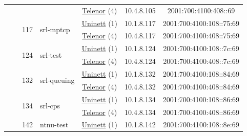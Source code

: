 \begin{small}
\begin{center}
\begin{longtable}{|c|c|c|c|c|c|c|c|}
  &  & \multicolumn{2}{|c|}{} & \multicolumn{2}{|c|}{\tiny{\href{https://www.telenor.no}{Telenor} (4)}} & \tiny{10.4.8.105} & \tiny{2001:700:4100:408::69} \\* \cline{3-3}\cline{4-4}\cline{5-5}\cline{6-6}\cline{7-7}\cline{8-8}
  &  & \multirow{2}{*}{\tiny{117}} & \multicolumn{1}{|l|}{\multirow{2}{*}{\tiny{srl-mptcp}}} & \multicolumn{2}{|c|}{\tiny{\href{https://www.uninett.no}{Uninett} (1)}} & \tiny{10.1.8.117} & \tiny{2001:700:4100:108::75:69} \\* \cline{5-5}\cline{6-6}\cline{7-7}\cline{8-8}
  &  &  &  & \multicolumn{2}{|c|}{\tiny{\href{https://www.telenor.no}{Telenor} (4)}} & \tiny{10.4.8.117} & \tiny{2001:700:4100:408::75:69} \\* \cline{3-3}\cline{4-4}\cline{5-5}\cline{6-6}\cline{7-7}\cline{8-8}
  &  & \multirow{2}{*}{\tiny{124}} & \multicolumn{1}{|l|}{\multirow{2}{*}{\tiny{srl-test}}} & \multicolumn{2}{|c|}{\tiny{\href{https://www.uninett.no}{Uninett} (1)}} & \tiny{10.1.8.124} & \tiny{2001:700:4100:108::7c:69} \\* \cline{5-5}\cline{6-6}\cline{7-7}\cline{8-8}
  &  &  &  & \multicolumn{2}{|c|}{\tiny{\href{https://www.telenor.no}{Telenor} (4)}} & \tiny{10.4.8.124} & \tiny{2001:700:4100:408::7c:69} \\* \cline{3-3}\cline{4-4}\cline{5-5}\cline{6-6}\cline{7-7}\cline{8-8}
  &  & \multirow{2}{*}{\tiny{132}} & \multicolumn{1}{|l|}{\multirow{2}{*}{\tiny{srl-queuing}}} & \multicolumn{2}{|c|}{\tiny{\href{https://www.uninett.no}{Uninett} (1)}} & \tiny{10.1.8.132} & \tiny{2001:700:4100:108::84:69} \\* \cline{5-5}\cline{6-6}\cline{7-7}\cline{8-8}
  &  &  &  & \multicolumn{2}{|c|}{\tiny{\href{https://www.telenor.no}{Telenor} (4)}} & \tiny{10.4.8.132} & \tiny{2001:700:4100:408::84:69} \\* \cline{3-3}\cline{4-4}\cline{5-5}\cline{6-6}\cline{7-7}\cline{8-8}
  &  & \multirow{2}{*}{\tiny{134}} & \multicolumn{1}{|l|}{\multirow{2}{*}{\tiny{srl-cps}}} & \multicolumn{2}{|c|}{\tiny{\href{https://www.uninett.no}{Uninett} (1)}} & \tiny{10.1.8.134} & \tiny{2001:700:4100:108::86:69} \\* \cline{5-5}\cline{6-6}\cline{7-7}\cline{8-8}
  &  &  &  & \multicolumn{2}{|c|}{\tiny{\href{https://www.telenor.no}{Telenor} (4)}} & \tiny{10.4.8.134} & \tiny{2001:700:4100:408::86:69} \\* \cline{3-3}\cline{4-4}\cline{5-5}\cline{6-6}\cline{7-7}\cline{8-8}
  &  & \multirow{2}{*}{\tiny{142}} & \multicolumn{1}{|l|}{\multirow{2}{*}{\tiny{ntnu-test}}} & \multicolumn{2}{|c|}{\tiny{\href{https://www.uninett.no}{Uninett} (1)}} & \tiny{10.1.8.142} & \tiny{2001:700:4100:108::8e:69} \\* \cline{5-5}\cline{6-6}\cline{7-7}\cline{8-8}

\end{longtable}
\end{center}
\end{small}
